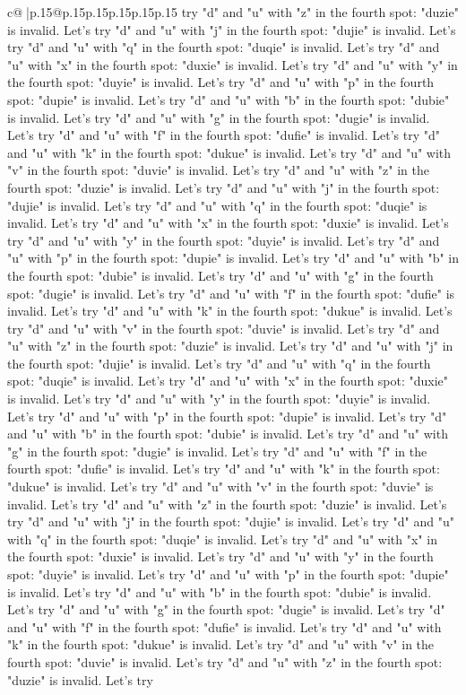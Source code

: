 \documentclass{article}
\begin{document}
{\begin{supertabular}{c@{$\;$}|p{.15\linewidth}@{}p{.15\linewidth}p{.15\linewidth}p{.15\linewidth}p{.15\linewidth}p{.15\linewidth}}
{{{try "d" and "u" with "z" in the fourth spot: "duzie" is invalid. Let's try "d" and "u" with "j" in the fourth spot: "dujie" is invalid. Let's try "d" and "u" with "q" in the fourth spot: "duqie" is invalid. Let's try "d" and "u" with "x" in the fourth spot: "duxie" is invalid. Let's try "d" and "u" with "y" in the fourth spot: "duyie" is invalid. Let's try "d" and "u" with "p" in the fourth spot: "dupie" is invalid. Let's try "d" and "u" with "b" in the fourth spot: "dubie" is invalid. Let's try "d" and "u" with "g" in the fourth spot: "dugie" is invalid. Let's try "d" and "u" with "f" in the fourth spot: "dufie" is invalid. Let's try "d" and "u" with "k" in the fourth spot: "dukue" is invalid. Let's try "d" and "u" with "v" in the fourth spot: "duvie" is invalid. Let's try "d" and "u" with "z" in the fourth spot: "duzie" is invalid. Let's try "d" and "u" with "j" in the fourth spot: "dujie" is invalid. Let's try "d" and "u" with "q" in the fourth spot: "duqie" is invalid. Let's try "d" and "u" with "x" in the fourth spot: "duxie" is invalid. Let's try "d" and "u" with "y" in the fourth spot: "duyie" is invalid. Let's try "d" and "u" with "p" in the fourth spot: "dupie" is invalid. Let's try "d" and "u" with "b" in the fourth spot: "dubie" is invalid. Let's try "d" and "u" with "g" in the fourth spot: "dugie" is invalid. Let's try "d" and "u" with "f" in the fourth spot: "dufie" is invalid. Let's try "d" and "u" with "k" in the fourth spot: "dukue" is invalid. Let's try "d" and "u" with "v" in the fourth spot: "duvie" is invalid. Let's try "d" and "u" with "z" in the fourth spot: "duzie" is invalid. Let's try "d" and "u" with "j" in the fourth spot: "dujie" is invalid. Let's try "d" and "u" with "q" in the fourth spot: "duqie" is invalid. Let's try "d" and "u" with "x" in the fourth spot: "duxie" is invalid. Let's try "d" and "u" with "y" in the fourth spot: "duyie" is invalid. Let's try "d" and "u" with "p" in the fourth spot: "dupie" is invalid. Let's try "d" and "u" with "b" in the fourth spot: "dubie" is invalid. Let's try "d" and "u" with "g" in the fourth spot: "dugie" is invalid. Let's try "d" and "u" with "f" in the fourth spot: "dufie" is invalid. Let's try "d" and "u" with "k" in the fourth spot: "dukue" is invalid. Let's try "d" and "u" with "v" in the fourth spot: "duvie" is invalid. Let's try "d" and "u" with "z" in the fourth spot: "duzie" is invalid. Let's try "d" and "u" with "j" in the fourth spot: "dujie" is invalid. Let's try "d" and "u" with "q" in the fourth spot: "duqie" is invalid. Let's try "d" and "u" with "x" in the fourth spot: "duxie" is invalid. Let's try "d" and "u" with "y" in the fourth spot: "duyie" is invalid. Let's try "d" and "u" with "p" in the fourth spot: "dupie" is invalid. Let's try "d" and "u" with "b" in the fourth spot: "dubie" is invalid. Let's try "d" and "u" with "g" in the fourth spot: "dugie" is invalid. Let's try "d" and "u" with "f" in the fourth spot: "dufie" is invalid. Let's try "d" and "u" with "k" in the fourth spot: "dukue" is invalid. Let's try "d" and "u" with "v" in the fourth spot: "duvie" is invalid. Let's try "d" and "u" with "z" in the fourth spot: "duzie" is invalid. Let's try }}}
\end{supertabular}}
\end{document}
